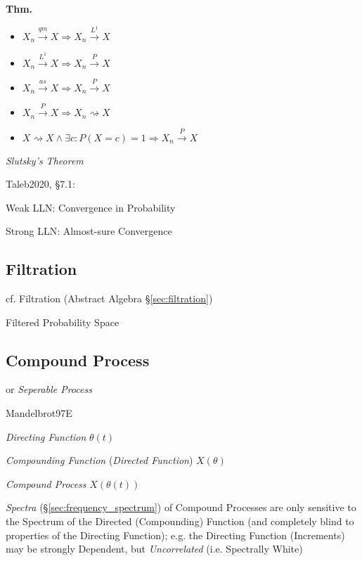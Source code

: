 \textbf{Thm.}
\begin{itemize}
  \item $X_n \xrightarrow{qm} X \Rightarrow X_n \xrightarrow{L^1} X$
  \item $X_n \xrightarrow{L^1} X \Rightarrow X_n \xrightarrow{P} X$
  \item $X_n \xrightarrow{as} X \Rightarrow X_n \xrightarrow{P} X$
  \item $X_n \xrightarrow{P} X \Rightarrow X_n \rightsquigarrow X$
  \item $X \rightsquigarrow X \wedge \exists c : P(X = c) = 1 \Rightarrow
    X_n \xrightarrow{P} X$
\end{itemize}

\emph{Slutsky's Theorem}

Taleb2020, \S 7.1:

Weak LLN: Convergence in Probability

Strong LLN: Almost-sure Convergence



\subsection{Filtration}\label{sec:stochastic_filtration}

cf. Filtration (Abstract Algebra \S\ref{sec:filtration})

Filtered Probability Space



\subsection{Compound Process}\label{sec:compound_process}

or \emph{Seperable Process}

Mandelbrot97E

\emph{Directing Function} $\theta(t)$

\emph{Compounding Function} (\emph{Directed Function}) $X(\theta)$

\emph{Compound Process} $X(\theta(t))$


\emph{Spectra} (\S\ref{sec:frequency_spectrum}) of Compound Processes are only
sensitive to the Spectrum of the Directed (Compounding) Function (and completely
blind to properties of the Directing Function); e.g. the Directing Function
(Increments) may be strongly Dependent, but \emph{Uncorrelated} (i.e. Spectrally
White)

